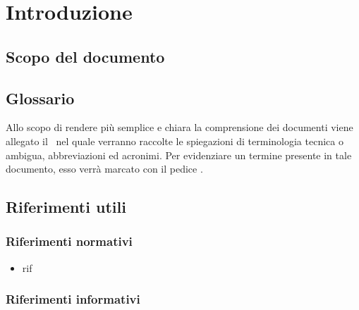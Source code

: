 \documentclass[../DefinizioneDiProdotto.tex]{subfiles}
\begin{document}
\section{Introduzione}
	\subsection{Scopo del documento}
	
	\subsection{Glossario} \label{sec:Glossario}
	Allo scopo di rendere più semplice e chiara la comprensione dei documenti viene allegato il \glossariov\ nel quale verranno raccolte le spiegazioni di  terminologia tecnica o  ambigua,
	abbreviazioni ed acronimi. Per evidenziare un termine presente in tale documento, esso verrà marcato con il pedice \g.
	\subsection{Riferimenti utili}
		\subsubsection{Riferimenti normativi}
		\begin{itemize}
			\item rif
		\end{itemize}
		\subsubsection{Riferimenti informativi}
\end{document}
